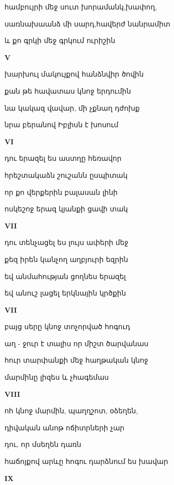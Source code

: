 համբույրի   մեջ  սուտ  խորամանկ,խափող,




սառնախաանձ մի սարդ,հավերժ  նանրամիտ



և քո գրկի մեջ գրկում ուրիշին 



\centerline  {\bf V}

խարխուլ մակույքով հանձնվիր ծովին


քան թե հավատաս կնոջ երդումին

նա կակազ վավար, մի չքնաղ դժոխք 


նրա բերանով Իբլիսն է խոսում

\centerline{\bf   VI}

 
դու երազել ես աստղը հեռավոր


հրեշտակաձն շուշանն ըսպիտակ

որ քո վերքերին բալասան լինի 


ոսկեշոջ  երազ կյանքի ցավի տակ


 \centerline  {\bf VII}

 դու տենչացել ես լույս ափերի մեջ


 քեզ իրեն կանչող աղբյուրի եզրին


 եվ անմահության ցողնես երազել


 եվ անուշ լացել երկնային կրծքին



\centerline {\bf VII}

բայց սերը կնոջ տոչորված հոգուդ



աղ - ջուր է տալիս  որ միշտ ծարվանաս


հուր տարփանքի  մեջ հաղթական կնոջ



մարմինը   լիզես   և չհագեմաս





\centerline {\bf  VIII}

ոհ  կնոջ մարմին, պաղղշոտ, օձեղեն, 




դիվական  անոթ ոճիտրների չար



դու, որ մսեղեն դառն



հաճոյքով արևը հոգու դարձնում ես խավար 







\centerline{\bf IX}

